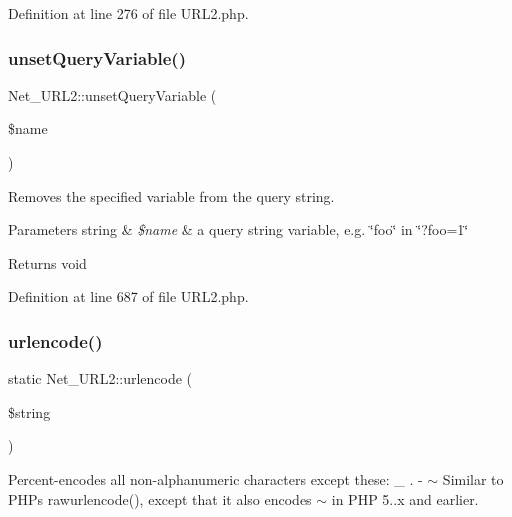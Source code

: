 Definition at line 276 of file U\+R\+L2.\+php.

\mbox{\label{classNet__URL2_a2841fc0817045ec33688490613d6e64c}} 
\subsubsection{\texorpdfstring{unset\+Query\+Variable()}{unsetQueryVariable()}}
{\footnotesize\ttfamily Net\+\_\+\+U\+R\+L2\+::unset\+Query\+Variable (\begin{DoxyParamCaption}\item[{}]{\$name }\end{DoxyParamCaption})}

Removes the specified variable from the query string.


\begin{DoxyParams}[1]{Parameters}
string & {\em \$name} & a query string variable, e.\+g. \char`\"{}foo\char`\"{} in \char`\"{}?foo=1\char`\"{}\\
\hline
\end{DoxyParams}
\begin{DoxyReturn}{Returns}
void 
\end{DoxyReturn}


Definition at line 687 of file U\+R\+L2.\+php.

\mbox{\label{classNet__URL2_ab870de85228bfe185ce8a208c0438c43}} 
\subsubsection{\texorpdfstring{urlencode()}{urlencode()}}
{\footnotesize\ttfamily static Net\+\_\+\+U\+R\+L2\+::urlencode (\begin{DoxyParamCaption}\item[{}]{\$string }\end{DoxyParamCaption})\hspace{0.3cm}{\ttfamily [static]}}

Percent-\/encodes all non-\/alphanumeric characters except these\+: \+\_\+ . -\/ $\sim$ Similar to P\+HP\textquotesingle{}s rawurlencode(), except that it also encodes $\sim$ in P\+HP 5..\+x and earlier.


